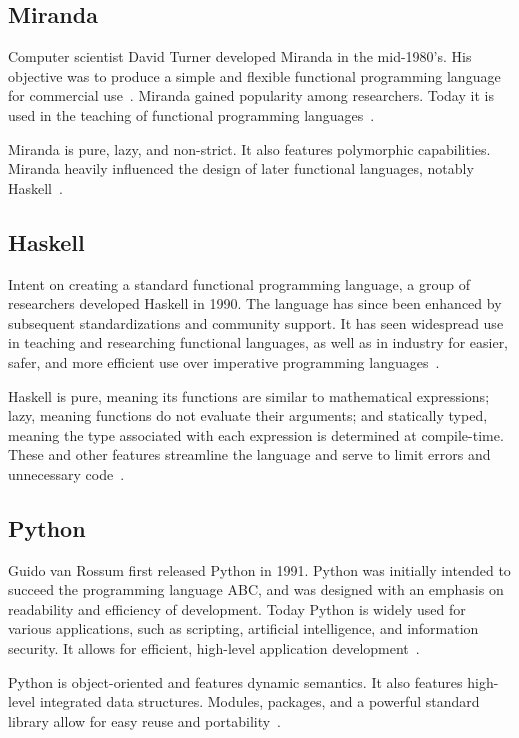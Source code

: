 \documentclass{article}
\begin{document}
\subsection{Miranda}

Computer scientist David Turner developed Miranda in the mid-1980's. His objective was to produce a simple and flexible functional programming language for commercial use~\cite{miranda1}. Miranda gained popularity among researchers. Today it is used in the teaching of functional programming languages~\cite{miranda2}.

Miranda is pure, lazy, and non-strict. It also features polymorphic capabilities. Miranda heavily influenced the design of later functional languages, notably Haskell~\cite{miranda2}.

\subsection{Haskell}

Intent on creating a standard functional programming language, a group of researchers developed Haskell in 1990. The language has since been enhanced by subsequent standardizations and community support. It has seen widespread use in teaching and researching functional languages, as well as in industry for easier, safer, and more efficient use over imperative programming languages~\cite{haskell1}.

Haskell is pure, meaning its functions are similar to mathematical expressions; lazy, meaning functions do not evaluate their arguments; and statically typed, meaning the type associated with each expression is determined at compile-time. These and other features streamline the language and serve to limit errors and unnecessary code~\cite{haskell2}.

\subsection{Python}

Guido van Rossum first released Python in 1991. Python was initially intended to succeed the programming language ABC, and was designed with an emphasis on readability and efficiency of development. Today Python is widely used for various applications, such as scripting, artificial intelligence, and information security. It allows for efficient, high-level application development~\cite{python1}.

Python is object-oriented and features dynamic semantics. It also features high-level integrated data structures. Modules, packages, and a powerful standard library allow for easy reuse and portability~\cite{python2}.
\end{document}
